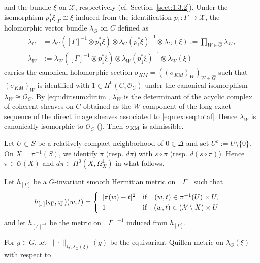\documentclass[amscd, leqno]{amsart}
\theoremstyle{plain}
\theoremstyle{definition}
\theoremstyle{remark}
\begin{document}
and the bundle $\xi$ on ${\mathcal X}$, respectively (cf. Section~\ref{sect:1.3.2}). 
Under the isomorphism $p_{1}^{*}\xi|_{\Gamma}\cong\xi$ induced from the identification $p_{1}\colon\Gamma\to{\mathcal X}$, 
the holomorphic vector bundle $\lambda_{G}$ on $C$ defined as
$$
\begin{array}{ll}
\lambda_{G}
&=
\lambda_{G}\left([\Gamma]^{-1}\otimes p_{1}^{*}\xi\right) \otimes \lambda_{G}(p_{1}^{*}\xi)^{-1} \otimes \lambda_{G}(\xi)
:=
\prod_{W\in\widehat{G}}\lambda_{W},
\\
\lambda_{W}
&:=
\lambda_{W}\left([\Gamma]^{-1}\otimes p_{1}^{*}\xi\right) \otimes \lambda_{W}(p_{1}^{*}\xi)^{-1} \otimes \lambda_{W}(\xi)
\end{array}
$$
carries the canonical holomorphic section $\sigma_{KM}=((\sigma_{KM})_{W})_{W\in\widehat{G}}$ such that 
$(\sigma_{KM})_{W}$ is identified with $1\in H^{0}(C,{\mathcal O}_{C})$ under the canonical isomorphism 
$\lambda_{W}\cong{\mathcal O}_{C}$.
By \eqref{eqn:dir:sum:dir:im}, $\lambda_{W}$ is the determinant of the acyclic complex of coherent sheaves on $C$ 
obtained as the $W$-component of the long exact sequence of the direct image sheaves associated to \eqref{eqn:ex:seq:total}.
Hence $\lambda_{W}$ is canonically isomorphic to ${\mathcal O}_{C}$ (\cite{Bismut95, BismutLebeau91, KnudsenMumford76}). 
Then $\sigma_{\rm KM}$ is admissible.
\par
Let $U\subset S$ be a relatively compact neighborhood of $0\in\Delta$ and set $U^{o}:=U\setminus\{0\}$. 
On $X=\pi^{-1}(S)$, we identify $\pi$ (resp. $d\pi$) with $s\circ\pi$ (resp. $d(s\circ\pi)$). 
Hence $\pi\in{\mathcal O}(X)$ and $d\pi\in H^{0}(X,\Omega^{1}_{X})$ in what follows.
\par
Let $h_{[\Gamma]}$ be a $G$-invariant smooth Hermitian metric on $[\Gamma]$ such that
\begin{equation}
\label{eqn:herm:met}
h_{[\Gamma]}(\varsigma_{\Gamma},\varsigma_{\Gamma})(w,t)
=
\begin{cases}
\begin{array}{lcr}
|\pi(w)-t|^{2}&\hbox{if}&(w,t)\in\pi^{-1}(U)\times U,
\\
1&\hbox{if}&(w,t)\in({\mathcal X}\setminus X)\times U
\end{array}
\end{cases}
\end{equation}
and let $h_{[\Gamma]^{-1}}$ be the metric on $[\Gamma]^{-1}$ induced from $h_{[\Gamma]}$.
\par
For $g\in G$, let $\|\cdot\|_{Q,\lambda_{G}(\xi)}(g)$ be the equivariant Quillen metric on $\lambda_{G}(\xi)$ with respect to 
\end{document}
